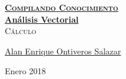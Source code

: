 \documentclass[12pt, fleqn]{report}                             %
\author{Oscar Rosas y Alan Ontiveros}                           %
\theoremstyle{break}                                            %
\begin{document}
\begin{titlepage}
    
    \pagecolor{TitlePageColor}                                      %
    \color{white}                                                   %
    \newcommand{\Github}{https://github.com/compilandoconocimiento} %

    \vspace                                                         %
    \baselineskip                                                   %

    \makebox[0pt][l]{\rule{1.3\textwidth}{3pt}}                     %
    
    \href{\Github}                                                  %
    {\textbf{\textsc{\Huge Compilando Conocimiento}}}\\[2.7cm]      %

    \href{\Github/LibroAnalisisVectorial}                           %
    {\fontsize{55}{66}\selectfont                                   %
        \textbf{Análisis Vectorial}}\\[0.5cm]                       %
    \textcolor{ColorSubtext}{\textsc{\Huge Cálculo}}                %
    
    \vfill                                                          %
    
    \href{https://github.com/alaneos777}                            %
    {\LARGE \textsf{Alan Enrique Ontiveros Salazar}}                %

    \vspace                                                         %
    \baselineskip                                                   %
    
    {\large \textsf{Enero 2018}}                                    %

\end{titlepage}
\end{document}
